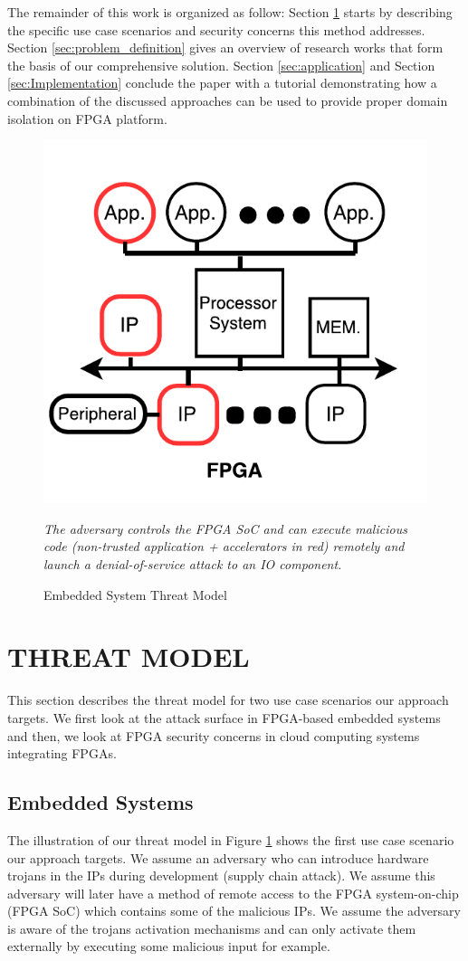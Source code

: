 \documentclass[sigconf]{acmart}
\theoremstyle{plain}
\theoremstyle{remark}
\begin{document}
The remainder of this work is organized as follow: Section \ref{sec:threat_model} starts by describing the specific use case scenarios and security concerns this method addresses. Section \ref{sec:problem_definition} gives an overview of research works that form the basis of our comprehensive solution. Section \ref{sec:application} and Section \ref{sec:Implementation} conclude the paper with a tutorial demonstrating how a combination of the discussed approaches can be used to provide proper domain isolation on FPGA platform.

\begin{figure}[h]
\centering
\includegraphics[width=0.5\columnwidth]{figures/ThreatModel.pdf}
\caption{Embedded System Threat Model}
\textit{The adversary controls the FPGA SoC and can execute malicious code (non-trusted application + accelerators in red) remotely and launch a denial-of-service attack to an IO component.}
\label{fig:threat}
\end{figure}

\section{THREAT MODEL} \label{sec:threat_model}

This section describes the threat model for two use case scenarios our approach targets. We first look at the attack surface in FPGA-based embedded systems and then, we look at FPGA security concerns in cloud computing systems integrating FPGAs.

\subsection{Embedded Systems}

The illustration of our threat model in Figure \ref{fig:threat} shows the first use case scenario our approach targets. We assume an adversary who can introduce hardware trojans in the IPs during development (supply chain attack). We assume this adversary will later have a method of remote access to the FPGA system-on-chip (FPGA SoC) which contains some of the malicious IPs. We assume the adversary is aware of the trojans activation mechanisms and can only activate them externally by executing some malicious input for example.
\end{document}
